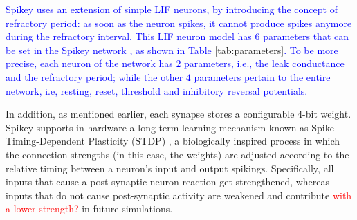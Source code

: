 \documentclass[utf8]{frontiersFPHY} %
\begin{document}
\textcolor{blue}{Spikey uses an extension of simple LIF neurons, by introducing the concept  of refractory period: as soon as the neuron spikes, it cannot produce  spikes anymore during the refractory interval. 
This LIF neuron model has 6 parameters that can be set in the Spikey network \cite{Pfeil2013}, as shown in Table \ref{tab:parameters}. 
To be more precise, each neuron of the network has $2$ parameters, i.e., the leak conductance and the refractory period; while the other $4$ parameters pertain to the entire network, i.e, resting, reset, threshold and inhibitory reversal potentials.}

In addition, as mentioned earlier, each synapse stores a configurable 4-bit weight.
Spikey supports in hardware a long-term learning mechanism known as Spike-Timing-Dependent Plasticity (STDP) \cite{schemmel2006implementing}, a biologically inspired process in which the connection strengths (in this case, the weights) are adjusted according to the relative timing between a neuron's input and output spikings.
Specifically, all inputs that cause a post-synaptic neuron reaction get strengthened, whereas inputs that do not cause post-synaptic activity are weakened and contribute \textcolor{red}{with a lower strength?} in future simulations.
\end{document}
